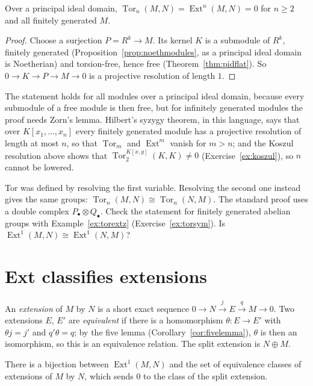 \begin{proposition}\label{prop:pidvanish}
Over a principal ideal domain, $\operatorname{Tor}_n(M,N)=\operatorname{Ext}^n(M,N)=0$ for $n\ge2$ and all finitely generated $M$.
\end{proposition}

\begin{proof}
Choose a surjection $P=R^k\to M$. Its kernel $K$ is a submodule of $R^k$, finitely generated (Proposition~\ref{prop:noethmodules}, as a principal ideal domain is Noetherian) and torsion-free, hence free (Theorem~\ref{thm:pidflat}). So
$0\to K\to P\to M\to0$ is a projective resolution of length $1$.
\end{proof}

The statement holds for all modules over a principal ideal domain, because every submodule of a free module is then free, but for infinitely generated modules the proof needs Zorn's lemma. Hilbert's syzygy theorem, in
this language, says that over $K[x_1,\dots,x_n]$ every finitely generated module has a projective resolution of length at most $n$, so that $\operatorname{Tor}_m$ and $\operatorname{Ext}^m$ vanish for $m>n$; and the
Koszul resolution above shows that $\operatorname{Tor}_2^{K[x,y]}(K,K)\ne0$ (Exercise~\ref{ex:koszul}), so $n$ cannot be lowered.

\begin{think}
Tor was defined by resolving the first variable. Resolving the second one instead gives the same groups: $\operatorname{Tor}_n(M,N)\cong\operatorname{Tor}_n(N,M)$. The standard proof uses a double complex
$P_\bullet\otimes Q_\bullet$. Check the statement for finitely generated abelian groups with Example~\ref{ex:torextz} (Exercise~\ref{ex:torsym}). Is $\operatorname{Ext}^1(M,N)\cong\operatorname{Ext}^1(N,M)$?
\end{think}

\section{Ext classifies extensions}

An \emph{extension} of $M$ by $N$ is a short exact sequence $0\to N\xrightarrow jE\xrightarrow qM\to0$. Two extensions $E$, $E'$ are \emph{equivalent} if there is a homomorphism $\theta\colon E\to E'$ with $\theta j=j'$ and $q'\theta=q$;
by the five lemma (Corollary~\ref{cor:fivelemma}), $\theta$ is then an isomorphism, so this is an equivalence relation. The split extension is $N\oplus M$.

\begin{theorem}\label{thm:extclass}
There is a bijection between $\operatorname{Ext}^1(M,N)$ and the set of equivalence classes of extensions of $M$ by $N$, which sends $0$ to the class of the split extension.
\end{theorem}

